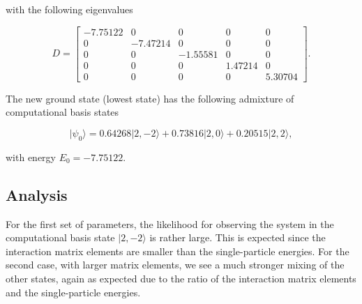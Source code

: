 \documentclass[11pt]{article}
\begin{document}
    with the following eigenvalues

    \[
D = \begin{bmatrix}
-7.75122 &  0 &  0 &  0  & 0 \\
0 & -7.47214  & 0  & 0  & 0 \\
0 &  0  & -1.55581 &  0  & 0 \\
0 &  0  & 0  & 1.47214  & 0 \\
0 &  0  & 0  & 0  & 5.30704
\end{bmatrix}.
\]

    The new ground state (lowest state) has the following admixture of
computational basis states

    \[
\vert \psi_0\rangle = 0.64268\vert 2,-2\rangle + 0.73816\vert 2,0\rangle + 0.20515 \vert 2,2\rangle,
\]

    with energy \(E_0 = -7.75122\).

    \hypertarget{analysis}{%
\subsection{Analysis}\label{analysis}}

For the first set of parameters, the likelihood for observing the system
in the computational basis state \(\vert 2,-2 \rangle\) is rather large.
This is expected since the interaction matrix elements are smaller than
the single-particle energies. For the second case, with larger matrix
elements, we see a much stronger mixing of the other states, again as
expected due to the ratio of the interaction matrix elements and the
single-particle energies.


    
    
    
\end{document}
